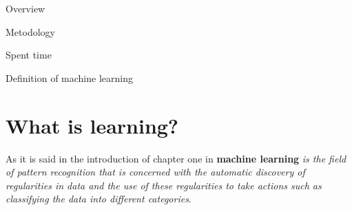 


\begin{frame}{Overview}
  \tableofcontents
\end{frame}

\begin{frame}{Metodology}
  
\end{frame}

\begin{frame}{Spent time}
  
\end{frame}
\begin{frame}{Definition of machine learning}%
  \section{What is learning?}
    As it is said in the introduction of chapter one in  \cite{BishopPatternRecognition}
 \textbf{machine learning} \textit{is the field of pattern 
recognition that is concerned with the automatic
 discovery of regularities in data and the use of
these regularities to take actions such as 
classifying the data into different categories}.
\end{frame}

